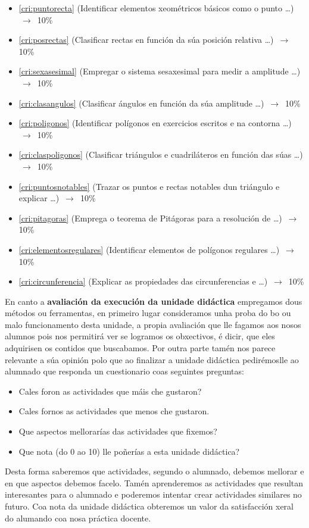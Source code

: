 \begin{itemize}
    \item \ref{cri:puntorecta}         (Identificar elementos xeométricos básicos como o punto \dots) $\,\to\,$ 10\%
    \item \ref{cri:posrectas}          (Clasificar rectas en función da súa posición relativa \dots) $\,\to\,$ 10\%
    \item \ref{cri:sexasesimal}        (Empregar o sistema sesaxesimal para medir a amplitude \dots) $\,\to\,$ 10\%
    \item \ref{cri:clasangulos}        (Clasificar ángulos en función da súa amplitude \dots) $\,\to\,$ 10\%
    \item \ref{cri:poligonos}          (Identificar polígonos en exercicios escritos e na contorna \dots) $\,\to\,$ 10\%
    \item \ref{cri:claspoligonos}      (Clasificar triángulos e cuadriláteros en función das súas  \dots) $\,\to\,$ 10\%
    \item \ref{cri:puntosnotables}     (Trazar os puntos e rectas notables dun triángulo e explicar  \dots) $\,\to\,$ 10\%
    \item \ref{cri:pitagoras}          (Emprega o teorema de Pitágoras para a resolución de   \dots) $\,\to\,$ 10\%
    \item \ref{cri:elementosregulares} (Identificar elementos de polígonos regulares  \dots) $\,\to\,$ 10\%
    \item \ref{cri:circunferencia}     (Explicar as propiedades das circunferencias e  \dots) $\,\to\,$ 10\%
\end{itemize}

En canto a \textbf{avaliación da execución da unidade didáctica} empregamos dous métodos ou ferramentas, en primeiro lugar consideramos unha proba do bo ou malo funcionamento desta unidade, a propia avaliación que lle fagamos aos nosos alumnos pois nos permitirá ver se logramos os obxectivos, é dicir, que eles adquirisen os contidos que buscabamos. Por outra parte tamén nos parece relevante a súa opinión polo que ao finalizar a unidade didáctica pedirémoslle ao alumnado que responda un cuestionario coas seguintes preguntas:

\begin{itemize}
    \item Cales foron  as actividades que máis che gustaron?
    \item Cales fornos as actividades que menos che gustaron.
    \item Que aspectos mellorarías das actividades que fixemos?
    \item Que nota (do 0 ao 10) lle poñerías a esta unidade didáctica?
\end{itemize}

Desta forma saberemos que actividades, segundo o alumnado, debemos mellorar e en que aspectos debemos facelo. Tamén aprenderemos as actividades que resultan interesantes para o alumnado e poderemos intentar crear actividades similares no futuro. Coa nota da unidade didáctica obteremos un valor da satisfacción xeral do alumando coa nosa práctica docente.
